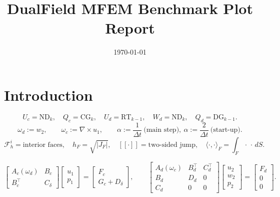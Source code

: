 \documentclass[11pt]{article}
\title{DualField MFEM Benchmark Plot Report}
\date{\today}
\begin{document}
\maketitle

\section*{Introduction}

\[
	U_c=\mathrm{ND}_k,\quad Q_c=\mathrm{CG}_k,\quad
	U_d=\mathrm{RT}_{k-1},\quad W_d=\mathrm{ND}_k,\quad Q_d=\mathrm{DG}_{k-1}.
\]
\[
	\omega_d := w_2,\qquad \omega_c := \nabla\times u_1,\qquad
	\alpha := \frac{1}{\Delta t}\ \text{(main step)},\ \alpha := \frac{2}{\Delta t}\ \text{(start-up)}.
\]
\[
	\mathcal F_h^i=\text{interior faces},\quad h_F=\sqrt{|J_F|},\quad
	[\![\cdot]\!]=\text{two-sided jump},\quad \langle\cdot,\cdot\rangle_F=\int_F \cdot\,\cdot\,dS.
\]

\[
	\begin{bmatrix}
		A_c(\omega_d) & B_c      \\
		B_c^\top      & C_\delta
	\end{bmatrix}
	\begin{bmatrix}u_1 \\ p_1\end{bmatrix}
	=
	\begin{bmatrix}F_c \\ G_c + D_\delta\end{bmatrix},
	\qquad
	\begin{bmatrix}
		A_d(\omega_c) & B_d^\top & C_d^\top \\
		B_d           & D_d      & 0        \\
		C_d           & 0        & 0
	\end{bmatrix}
	\begin{bmatrix}u_2 \\ w_2 \\ p_2\end{bmatrix}
	=
	\begin{bmatrix}F_d \\ 0 \\ 0\end{bmatrix}.
\]
\end{document}
